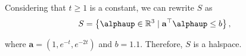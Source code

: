 \documentclass[12pt,a4paper]{article}
\begin{document}
Considering that \(t \geq 1\) is a constant, we can rewrite \(S\) as
\begin{align}
    S = \left\{ \boldsymbol{\alphaup} \in \mathbb{R}^3 \mid \mathbf{a}^\top \boldsymbol{\alphaup} \leq b \right\},
\end{align}

where \(\mathbf{a} = (1, e^{-t}, e^{-2t})\) and \(b=1.1\). Therefore, \(S\) is a halspace.
\end{document}
